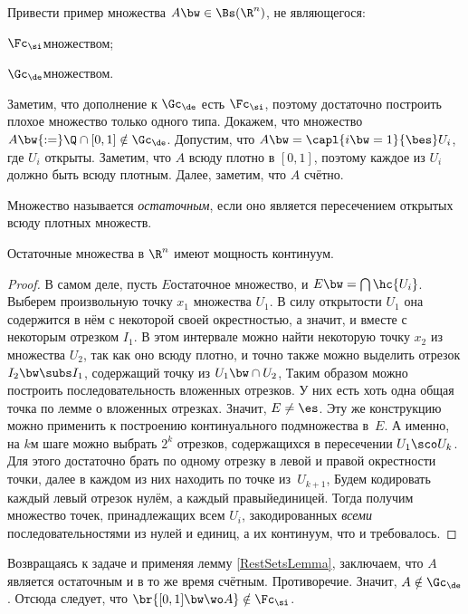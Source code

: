 \documentclass[a4paper]{article}
\begin{document}
\begin{problem}
  Привести пример множества $A \bw\in \Bs(\R^n)$, не являющегося:
  \begin{items}{-3}
     \item $\Fc_\si$\д множеством;
     \item $\Gc_\de$\д множеством.
  \end{items}
\end{problem}
\begin{solution}
  Заметим, что дополнение к $\Gc_\de$ есть $\Fc_\si$, поэтому достаточно построить плохое множество только
  одного типа. Докажем, что множество $A \bw{:=} \Q \cap [0,1] \notin \Gc_\de$. Допустим, что
  $A \bw= \capl{i\bw=1}{\bes} U_i$, где $U_i$ открыты. Заметим, что $A$ всюду плотно
  в $[0,1]$, поэтому каждое из $U_i$ должно быть всюду плотным. Далее, заметим, что $A$ счётно.


\begin{df}
  Множество называется \emph{остаточным}, если оно является пересечением открытых всюду плотных множеств.
\end{df}

\begin{lemma}
  \label{RestSetsLemma}Остаточные множества в $\R^n$ имеют мощность континуум.
\end{lemma}
\begin{proof}
  В самом деле, пусть $E$\т остаточное множество, и $E \bw= \bigcap \hc{U_i}$. Выберем произвольную
  точку $x_1$ множества $U_1$. В силу открытости $U_1$ она содержится в нём с некоторой своей
  окрестностью, а значит, и вместе с некоторым отрезком $I_1$. В этом интервале можно найти
  некоторую точку $x_2$ из множества $U_2$, так как оно всюду плотно, и точно также можно
  выделить отрезок $I_2 \bw\subs I_1$, содержащий точку из $U_1 \bw\cap U_2$,  Таким
  образом можно построить последовательность вложенных отрезков. У них есть хоть одна общая
  точка по лемме о вложенных отрезках. Значит, $E \neq \es$. Эту же конструкцию можно применить
  к построению континуального подмножества в~$E$. А именно, на $k$\д м шаге можно выбрать $2^k$
  отрезков, содержащихся в пересечении $U_1 \sco U_k$. Для этого достаточно брать по одному
  отрезку в левой и правой окрестности точки, далее в каждом из них находить по точке
  из~$U_{k+1}$,  Будем кодировать каждый левый отрезок нулём, а каждый правый\т единицей.
  Тогда получим множество точек, принадлежащих всем $U_i$, закодированных \emph{всеми}
  последовательностями из нулей и единиц, а их континуум, что и требовалось.
\end{proof}

  Возвращаясь к задаче и применяя лемму \ref{RestSetsLemma}, заключаем, что $A$ является
  остаточным и в то же время счётным. Противоречие. Значит, $A \notin \Gc_\de$. Отсюда
  следует, что $\br{[0,1]\bw\wo A} \notin \Fc_\si$.
\end{solution}
\end{document}
